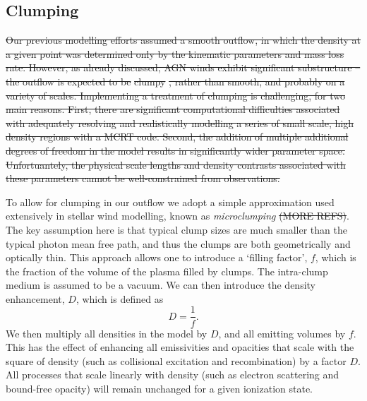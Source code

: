 \documentclass[preprint, a4paper, 11pt]{aastex}
\providecommand{\DIFdel}[1]{{\protect\color{red}\sout{#1}}}                      %
\providecommand{\DIFdelbegin}{} %
\providecommand{\DIFdelend}{} %
\begin{document}
\subsection{Clumping}

\DIFdelbegin \DIFdel{Our previous modelling efforts assumed a smooth outflow, 
in which the density at a given point was determined only by the 
kinematic parameters and mass loss rate. However, as already discussed,
AGN winds exhibit significant substructure -- the outflow is expected to be
}%
\DIFdel{clumpy}%
\DIFdel{, rather than smooth, and probably on a variety of scales. 
Implementing a treatment of clumping is challenging, for
two main reasons. First, there are significant 
computational difficulties associated with adequately
resolving and realistically modelling a series of small scale, high density
regions with a MCRT code. Second, the addition of multiple additional degrees of
freedom in the model results in significantly wider parameter space.
Unfortuantely, the physical scale lengths and density contrasts 
associated with these parameters cannot be well-constrained from observations.
}%

\DIFdelend To allow for clumping in our outflow we adopt a simple approximation
used extensively in stellar wind modelling, known as 
{\em microclumping} \citep{hamann1998}\DIFdelbegin \DIFdel{(MORE REFS)}\DIFdelend . The key assumption here is that 
typical clump sizes are much smaller than the typical photon mean free path, 
and thus the clumps are 
both geometrically and optically thin. This approach 
allows one to introduce a `filling factor', $f$, which is the 
fraction of the volume of the plasma filled by clumps. The intra-clump
medium is assumed to be a vacuum. We can then introduce the 
density enhancement, $D$, which is defined as 
\begin{equation}
D = \frac{1}{f}.
\end{equation}
We then multiply all densities in the model by $D$, and all emitting volumes
by $f$. This has the effect of enhancing all emissivities and opacities
that scale with the square of density (such as collisional excitation and recombination) 
by a factor $D$. All processes that scale linearly with density 
(such as electron scattering and bound-free opacity)
will remain unchanged for a given ionization state. 
\end{document}

